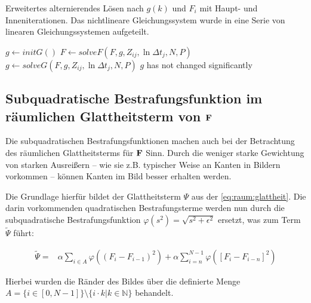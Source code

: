 \begin{Algorithmus} %
\caption{Erweitertes alternierendes Lösen nach $g(k)$ und $F_i$ mit Haupt- und Inneniterationen. Das nichtlineare Gleichungssystem wurde in eine Serie von linearen Gleichungssystemen aufgeteilt.}
\label{alg:alternierend:extended}
\begin{algorithmic}
	\State $g \gets initG()$
		\Repeat
		    \State $F \gets solveF(F, g, Z_{ij}, \ln \Delta t_j, N, P)$
		\Repeat
			\State $g \gets solveG(F, g, Z_{ij}, \ln \Delta t_j, N, P)$
		\Until$g$ has not changed significantly
	\EndWhile
	\State \Return [$g$, $F$]
\EndFunction
\end{algorithmic}
\end{Algorithmus}






\subsection{Subquadratische Bestrafungsfunktion im räumlichen Glattheitsterm von $\mathbf F$}
\label{subsec:robust:e:raum}
Die subquadratischen Bestrafungsfunktionen machen auch bei der Betrachtung des räumlichen Glattheitsterms für $\mathbf F$ 
Sinn. Durch die weniger starke Gewichtung von starken Ausreißern -- wie sie z.B. typischer Weise an Kanten in Bildern vorkommen -- können Kanten im Bild besser erhalten werden.

Die Grundlage hierfür bildet der Glattheitsterm $\Psi$ aus der \autoref{eq:raum:glattheit}. Die darin vorkommenden quadratischen Bestrafungsterme werden nun durch die subquadratische Bestrafungsfunktion $\varphi(s^2) = \sqrt{s^2+\epsilon^2}$ ersetzt, was zum Term $\tilde{\Psi}$ führt:

\begin{align}
\label{eq:robust:raum}
\tilde{\Psi} =& 
        \alpha \sum_{i\in A}
            \varphi((F_i - F_{i-1})^2)
        +\alpha \sum_{i=n}^{N-1}\varphi([F_i - F_{i-n}]^2)
\end{align}

Hierbei wurden die Ränder des Bildes über die definierte Menge $A= \{ i \in [0,N-1]\} \setminus \{ i \cdot k | k \in \mathbb{N} \}$ behandelt.


